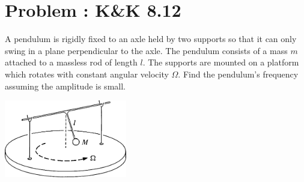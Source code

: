 \documentclass[problems]{esg8012pset}
\begin{document}
\section{Problem \thesection: K\&K 8.12}
  A pendulum is rigidly fixed to an axle held by two supports so that it can only swing in a plane perpendicular to the axle. The pendulum consists of a mass $m$ attached to a massless rod of length $l$. The supports are mounted on a platform which rotates with constant angular velocity $\Omega$. Find the pendulum's frequency assuming the amplitude is small.
  \begin{center}\includegraphics[width=0.4\textwidth]{ps11_4}\end{center}
\end{document}
